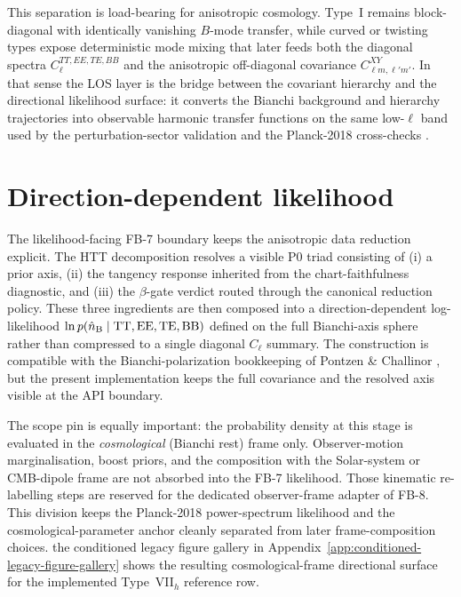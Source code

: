 This separation is load-bearing for anisotropic cosmology.  Type~I
remains block-diagonal with identically vanishing $B$-mode transfer,
while curved or twisting types expose deterministic mode mixing that
later feeds both the diagonal spectra
$C_\ell^{TT,EE,TE,BB}$ and the anisotropic off-diagonal covariance
$C_{\ell m,\ell' m'}^{XY}$.  In that sense the LOS layer is the bridge
between the covariant hierarchy and the directional likelihood
surface: it converts the Bianchi background and hierarchy trajectories
into observable harmonic transfer functions on the same low-$\ell$
band used by the perturbation-sector validation and the Planck-2018
cross-checks \cite{LewisChallinor2006,Planck2018V,Planck2018VI}.


\section{Direction-dependent likelihood}
\label{sec:direction-likelihood}

The likelihood-facing FB-7 boundary keeps the anisotropic data
reduction explicit.  The HTT decomposition resolves a visible P0 triad
consisting of (i) a prior axis, (ii) the tangency response inherited
from the chart-faithfulness diagnostic, and (iii) the $\beta$-gate
verdict routed through the canonical reduction policy.  These three
ingredients are then composed into a direction-dependent
log-likelihood
$\ln p(\hat{n}_{\rm B} \mid {\rm TT,EE,TE,BB})$
defined on the full Bianchi-axis sphere rather than compressed to a
single diagonal $C_\ell$ summary.  The construction is compatible with
the Bianchi-polarization bookkeeping of Pontzen \& Challinor
\cite{PontzenChallinor2007}, but the present implementation keeps the
full covariance and the resolved axis visible at the API boundary.

The scope pin is equally important: the probability density at this
stage is evaluated in the \emph{cosmological} (Bianchi rest) frame
only.  Observer-motion marginalisation, boost priors, and the
composition with the Solar-system or CMB-dipole frame are not absorbed
into the FB-7 likelihood.  Those kinematic re-labelling steps are
reserved for the dedicated observer-frame adapter of FB-8.  This
division keeps the Planck-2018 power-spectrum likelihood
\cite{Planck2018V} and the cosmological-parameter anchor
\cite{Planck2018VI} cleanly separated from later frame-composition
choices.  the conditioned legacy figure gallery in Appendix~\ref{app:conditioned-legacy-figure-gallery} shows the resulting
cosmological-frame directional surface for the implemented
Type~VII$_h$ reference row.


